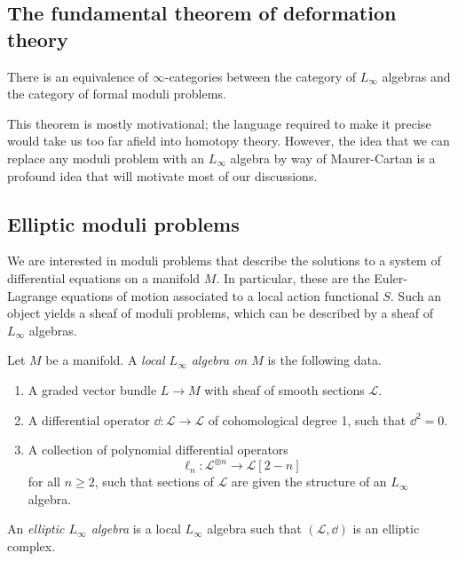 \subsection{The fundamental theorem of deformation theory}

\begin{theorem}\label{thm:11-1-2}
	There is an equivalence of $\infty $-categories between the category of $L_\infty $ algebras and the category of formal moduli problems.
\end{theorem}

This theorem is mostly motivational; the language required to make it precise would take us too far afield into homotopy theory. However, the idea that we can replace any moduli problem with an $L_\infty $ algebra by way of Maurer-Cartan is a profound idea that will motivate most of our discussions.

\subsection{Elliptic moduli problems}

We are interested in moduli problems that describe the solutions to a system of differential equations on a manifold $M$. In particular, these are the Euler-Lagrange equations of motion associated to a local action functional $S$. Such an object yields a sheaf of moduli problems, which can be described by a sheaf of $L_\infty $ algebras.

\begin{definition}\label{dfn:11-1-3}
	Let $M$ be a manifold. A \emph{local $L_\infty $ algebra on $M$} is the following data.
	\begin{enumerate}
		\item A graded vector bundle $L\to M$ with sheaf of smooth sections $\mathcal{L} $.
		\item A differential operator $\dd : \mathcal{L}  \to \mathcal{L} $ of cohomological degree 1, such that $\dd ^2=0$.
		\item A collection of polynomial differential operators
			\[
				\ell _n : \mathcal{L} ^{\otimes n}  \to \mathcal{L} [2-n]
			\]
			for all $n\geq 2$, such that sections of $\mathcal{L} $ are given the structure of an $L_\infty $ algebra.
	\end{enumerate}
\end{definition}

\begin{definition}\label{dfn:11-1-4}
	An \emph{elliptic $L_\infty $ algebra} is a local $L_\infty $ algebra such that $(\mathcal{L} ,\dd )$ is an elliptic complex.
\end{definition}

